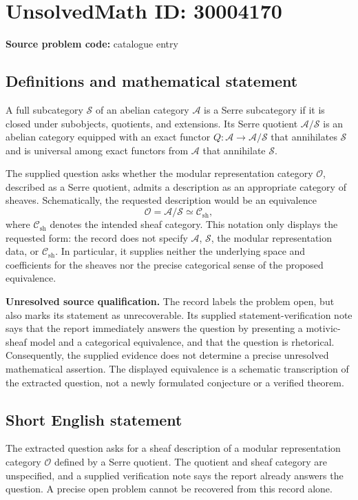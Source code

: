 \documentclass[11pt]{article}
\begin{document}
\section*{UnsolvedMath ID: 30004170}
\textbf{Source problem code:} catalogue entry
\subsection{Definitions and mathematical statement}
A full subcategory \(\mathcal S\) of an abelian category \(\mathcal A\) is a Serre subcategory if it is closed under subobjects, quotients, and extensions. Its Serre quotient \(\mathcal A/\mathcal S\) is an abelian category equipped with an exact functor \(Q:\mathcal A\to\mathcal A/\mathcal S\) that annihilates \(\mathcal S\) and is universal among exact functors from \(\mathcal A\) that annihilate \(\mathcal S\).

The supplied question asks whether the modular representation category \(\mathcal O\), described as a Serre quotient, admits a description as an appropriate category of sheaves. Schematically, the requested description would be an equivalence
\[
\mathcal O=\mathcal A/\mathcal S\simeq\mathcal C_{\mathrm{sh}},
\]
where \(\mathcal C_{\mathrm{sh}}\) denotes the intended sheaf category. This notation only displays the requested form: the record does not specify \(\mathcal A\), \(\mathcal S\), the modular representation data, or \(\mathcal C_{\mathrm{sh}}\). In particular, it supplies neither the underlying space and coefficients for the sheaves nor the precise categorical sense of the proposed equivalence.

\textbf{Unresolved source qualification.} The record labels the problem open, but also marks its statement as unrecoverable. Its supplied statement-verification note says that the report immediately answers the question by presenting a motivic-sheaf model and a categorical equivalence, and that the question is rhetorical. Consequently, the supplied evidence does not determine a precise unresolved mathematical assertion. The displayed equivalence is a schematic transcription of the extracted question, not a newly formulated conjecture or a verified theorem.
\subsection{Short English statement}
The extracted question asks for a sheaf description of a modular representation category \(\mathcal O\) defined by a Serre quotient. The quotient and sheaf category are unspecified, and a supplied verification note says the report already answers the question. A precise open problem cannot be recovered from this record alone.
\end{document}
